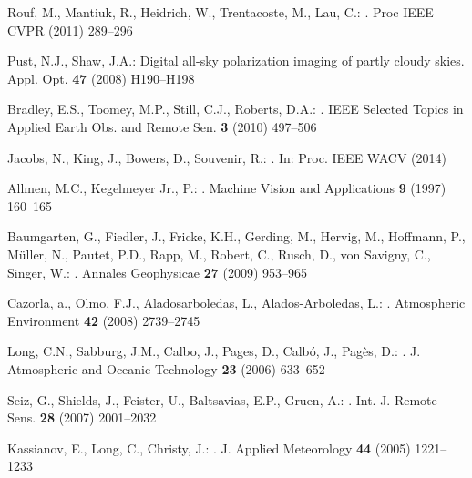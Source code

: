 \documentclass[runningheads]{llncs}
\begin{document}
\begin{thebibliography}{10}
Rouf, M., Mantiuk, R., Heidrich, W., Trentacoste, M., Lau, C.:
.
\newblock Proc IEEE CVPR (2011)  289--296

Pust, N.J., Shaw, J.A.:
\newblock Digital all-sky polarization imaging of partly cloudy skies.
\newblock Appl. Opt. \textbf{47} (2008)  H190--H198

Bradley, E.S., Toomey, M.P., Still, C.J., Roberts, D.A.:
.
\newblock IEEE Selected Topics in Applied Earth Obs. and Remote Sen. \textbf{3}
  (2010)  497--506

Jacobs, N., King, J., Bowers, D., Souvenir, R.:
.
\newblock In: Proc. IEEE WACV (2014)

Allmen, M.C., {Kegelmeyer Jr.}, P.:
.
\newblock Machine Vision and Applications \textbf{9} (1997)  160--165

Baumgarten, G., Fiedler, J., Fricke, K.H., Gerding, M., Hervig, M., Hoffmann,
  P., M\"{u}ller, N., Pautet, P.D., Rapp, M., Robert, C., Rusch, D., von
  Savigny, C., Singer, W.:
.
\newblock Annales Geophysicae \textbf{27} (2009)  953--965

Cazorla, a., Olmo, F.J., Aladosarboledas, L., Alados-Arboledas, L.:
.
\newblock Atmospheric Environment \textbf{42} (2008)  2739--2745

Long, C.N., Sabburg, J.M., Calbo, J., Pages, D., Calb\'{o}, J., Pag\`{e}s, D.:
.
\newblock J. Atmospheric and Oceanic Technology \textbf{23} (2006)
  633--652

Seiz, G., Shields, J., Feister, U., Baltsavias, E.P., Gruen, A.:
.
\newblock Int. J. Remote Sens. \textbf{28} (2007)  2001--2032

Kassianov, E., Long, C., Christy, J.:
.
\newblock J. Applied Meteorology \textbf{44} (2005)  1221--1233


\end{thebibliography}
\end{document}
